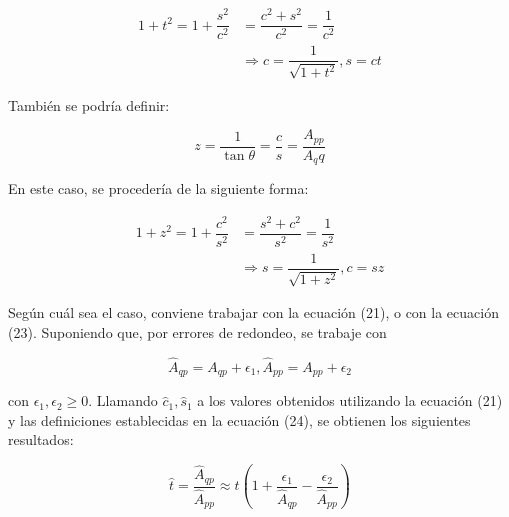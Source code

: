 \documentclass[spanish]{article}
\begin{document}
            \begin{equation}
                \begin{split}
                    1 + t^{2} = 1 + \dfrac{s^{2}}{c^{2}} 
                    &= \dfrac{c^{2} + s^{2}}{c^{2}} = \dfrac{1}{c^{2}}\\
                    &\Rightarrow c = \dfrac{1}{\sqrt{1 + t^{2}}}, s = ct
                \end{split}
            \end{equation}
            
            También se podría definir:
            
            \begin{equation}
                z = \dfrac{1}{\tan{\theta}} = \dfrac{c}{s} = \dfrac{A_{p p}}{A_{q}{q}}
            \end{equation}
            
            En este caso, se procedería de la siguiente forma:
            
            \begin{equation}
                \begin{split}
                    1 + z^{2} = 1 + \dfrac{c^{2}}{s^{2}} 
                    &= \dfrac{s^{2} + c^{2}}{s^{2}} = \dfrac{1}{s^{2}}\\
                    &\Rightarrow s = \dfrac{1}{\sqrt{1 + z^{2}}}, c = sz
                \end{split}
            \end{equation}
            
            
            Según cuál sea el caso, conviene trabajar con la ecuación (21), o con la ecuación (23). Suponiendo que, por errores de redondeo, se trabaje con 
            
            \begin{equation}
                \hat{A}_{q p} = A_{q p} + \epsilon_{1}, \hat{A}_{p p} = A_{p p} + \epsilon_{2}
            \end{equation}
            
            con $\epsilon_{1}, \epsilon_{2} \geq 0$. Llamando $\hat{c}_{1}, \hat{s}_{1}$ a los valores obtenidos utilizando la ecuación (21) y las definiciones establecidas en la ecuación (24), se obtienen los siguientes resultados:
            
            \begin{equation}
                \hat{t} = \dfrac{\hat{A}_{q p}}{\hat{A}_{p p}} \approx t \left(1 + \dfrac{\epsilon_{1}}{\hat{A}_{q p}} - \dfrac{\epsilon_{2}}{\hat{A}_{p p}}\right)
            \end{equation}
            
\end{document}
